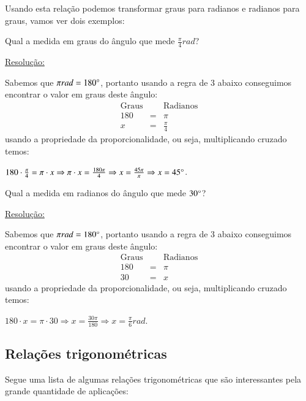   Usando esta relação podemos transformar graus para radianos e radianos para graus, vamos ver dois exemplos:

  \begin{exem}
   Qual a medida em graus do ângulo que mede $\frac{\pi}{4} rad$?

   \underline{Resolução:}

   Sabemos que $\pi rad= 180\degree$, portanto usando a regra de 3 abaixo conseguimos encontrar o valor em graus deste ângulo:
   \begin{eqnarray*}
  \text{Graus} & & \text{Radianos} \\
   180 & = & \pi\\
  x & = & \frac{\pi}{4}
 \end{eqnarray*}
 usando a propriedade da proporcionalidade, ou seja, multiplicando cruzado temos:

 $180 \cdot \frac{\pi}{4}= \pi \cdot x \Rightarrow \pi \cdot x= \frac{180 \pi}{4} \Rightarrow x= \frac{45 \pi}{\pi} \Rightarrow x= 45\degree$.

 \fim
  \end{exem}

  \begin{exem}
   Qual a medida em radianos do ângulo que mede $30\degree$?

   \underline{Resolução:}

   Sabemos que $\pi rad= 180\degree$, portanto usando a regra de 3 abaixo conseguimos encontrar o valor em graus deste ângulo:
   \begin{eqnarray*}
  \text{Graus} & & \text{Radianos} \\
   180 & = & \pi\\
  30 & = & x
 \end{eqnarray*}
 usando a propriedade da proporcionalidade, ou seja, multiplicando cruzado temos:

 $180 \cdot x= \pi \cdot 30 \Rightarrow x= \frac{30 \pi}{180} \Rightarrow x= \frac{\pi}{6} rad$.

 \fim
  \end{exem}



 \subsection{Relações trigonométricas}

 Segue uma lista de algumas relações trigonométricas que são interessantes pela grande quantidade de aplicações:

